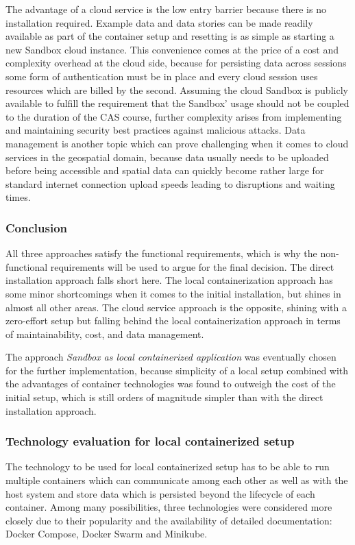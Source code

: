 \documentclass[11pt, a4paper, oneside, parskip=full-]{scrartcl}
\begin{document}
The advantage of a cloud service is the low entry barrier because there is no
installation required. Example data and data stories can be made readily
available as part of the container setup and resetting is as simple as starting
a new Sandbox cloud instance. This convenience comes at the price of a cost and
complexity overhead at the cloud side, because for persisting data across
sessions some form of authentication must be in place and every cloud session
uses resources which are billed by the second. Assuming the cloud Sandbox is
publicly available to fulfill the requirement that the Sandbox' usage should not
be coupled to the duration of the CAS course, further complexity arises from
implementing and maintaining security best practices against malicious attacks.
Data management is another topic which can prove challenging when it comes to
cloud services in the geospatial domain, because data usually needs to be
uploaded before being accessible and spatial data can quickly become rather
large for standard internet connection upload speeds leading to disruptions and
waiting times.

\subsubsection*{Conclusion}
All three approaches satisfy the functional requirements, which is why the
non-functional requirements will be used to argue for the final decision. The
direct installation approach falls short here. The local containerization
approach has some minor shortcomings when it comes to the initial installation,
but shines in almost all other areas. The cloud service approach is the
opposite, shining with a zero-effort setup but falling behind the local
containerization approach in terms of maintainability, cost, and data
management.

The approach \emph{Sandbox as local containerized application} was eventually
chosen for the further implementation, because simplicity of a local setup
combined with the advantages of container technologies was found to outweigh the
cost of the initial setup, which is still orders of magnitude simpler than with
the direct installation approach.

\subsubsection{Technology evaluation for local containerized setup}
The technology to be used for local containerized setup has to be able to run
multiple containers which can communicate among each other as well as with the
host system and store data which is persisted beyond the lifecycle of each
container. Among many possibilities, three technologies were considered more
closely due to their popularity and the availability of detailed documentation:
Docker Compose, Docker Swarm and Minikube.
\end{document}
